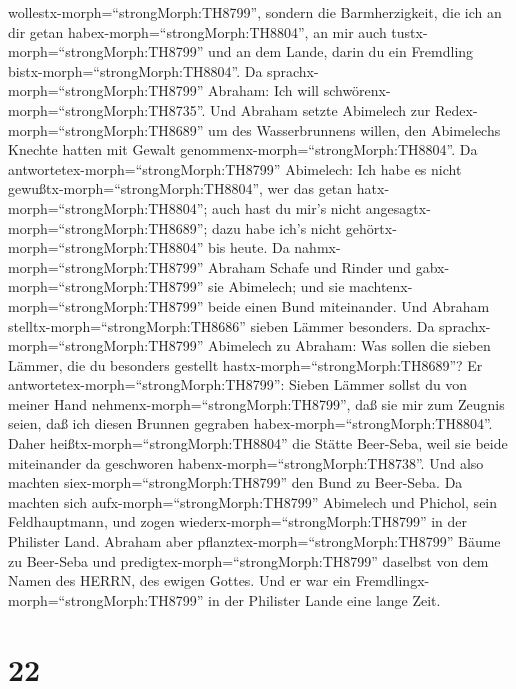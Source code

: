 wollestx-morph=``strongMorph:TH8799'', sondern die Barmherzigkeit, die
ich an dir getan habex-morph=``strongMorph:TH8804'', an mir auch
tustx-morph=``strongMorph:TH8799'' und an dem Lande, darin du ein
Fremdling bistx-morph=``strongMorph:TH8804''.  Da
sprachx-morph=``strongMorph:TH8799'' Abraham: Ich will
schwörenx-morph=``strongMorph:TH8735''.  Und Abraham setzte
Abimelech zur Redex-morph=``strongMorph:TH8689'' um des Wasserbrunnens
willen, den Abimelechs Knechte hatten mit Gewalt
genommenx-morph=``strongMorph:TH8804''.  Da
antwortetex-morph=``strongMorph:TH8799'' Abimelech: Ich habe es nicht
gewußtx-morph=``strongMorph:TH8804'', wer das getan
hatx-morph=``strongMorph:TH8804''; auch hast du mir's nicht
angesagtx-morph=``strongMorph:TH8689''; dazu habe ich's nicht
gehörtx-morph=``strongMorph:TH8804'' bis heute.  Da
nahmx-morph=``strongMorph:TH8799'' Abraham Schafe und Rinder und
gabx-morph=``strongMorph:TH8799'' sie Abimelech; und sie
machtenx-morph=``strongMorph:TH8799'' beide einen Bund miteinander.
 Und Abraham stelltx-morph=``strongMorph:TH8686'' sieben
Lämmer besonders.  Da sprachx-morph=``strongMorph:TH8799''
Abimelech zu Abraham: Was sollen die sieben Lämmer, die du besonders
gestellt hastx-morph=``strongMorph:TH8689''?  Er
antwortetex-morph=``strongMorph:TH8799'': Sieben Lämmer sollst du von
meiner Hand nehmenx-morph=``strongMorph:TH8799'', daß sie mir zum
Zeugnis seien, daß ich diesen Brunnen gegraben
habex-morph=``strongMorph:TH8804''.  Daher
heißtx-morph=``strongMorph:TH8804'' die Stätte Beer-Seba, weil sie beide
miteinander da geschworen habenx-morph=``strongMorph:TH8738''.
 Und also machten siex-morph=``strongMorph:TH8799'' den
Bund zu Beer-Seba. Da machten sich aufx-morph=``strongMorph:TH8799''
Abimelech und Phichol, sein Feldhauptmann, und zogen
wiederx-morph=``strongMorph:TH8799'' in der Philister Land.
 Abraham aber pflanztex-morph=``strongMorph:TH8799'' Bäume
zu Beer-Seba und predigtex-morph=``strongMorph:TH8799'' daselbst von dem
Namen des HERRN, des ewigen Gottes.  Und er war ein
Fremdlingx-morph=``strongMorph:TH8799'' in der Philister Lande eine
lange Zeit.

\hypertarget{section-21}{%
\section{22}\label{section-21}}


